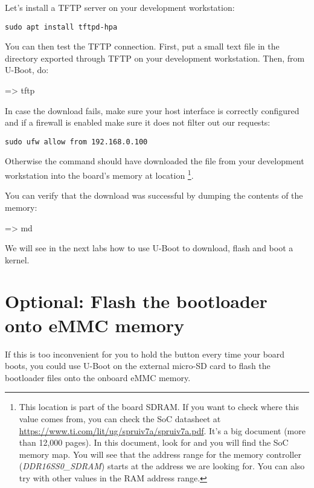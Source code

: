 Let's install a TFTP server on your development workstation:

\begin{verbatim}
sudo apt install tftpd-hpa
\end{verbatim}

You can then test the TFTP connection. First, put a small text file in
the directory exported through TFTP on your development
workstation. Then, from U-Boot, do:

\begin{ubootinput}
=> tftp %
\end{ubootinput}

In case the download fails, make sure your host interface is correctly
configured and if a firewall is enabled make sure it does not filter out our
requests:
\begin{verbatim}
sudo ufw allow from 192.168.0.100
\end{verbatim}

Otherwise the  command should have downloaded the
 file from your development workstation into
the board's memory at location {\tt \zimageboardaddr}\footnote{
This location is part of the board SDRAM. If you want
to check where this value comes from, you can check the SoC
datasheet at
\url{https://www.ti.com/lit/ug/spruiv7a/spruiv7a.pdf}.
It's a big document (more than 12,000 pages). In this document, look
for  and you will find the SoC memory map.
You will see that the address range for the memory controller
({\em DDR16SS0\_SDRAM})
starts at the address we are looking for.
You can also try with other values in the RAM address range.}.

You can verify that the download was successful by dumping the
contents of the memory:

\begin{ubootinput}
=> md %
\end{ubootinput}

We will see in the next labs how to use U-Boot to download, flash and
boot a kernel.

\section{Optional: Flash the bootloader onto eMMC memory}
If this is too inconvenient for you to hold the 
button every time your board boots, you could use U-Boot on the external
micro-SD card to flash the bootloader files onto the onboard eMMC memory.

